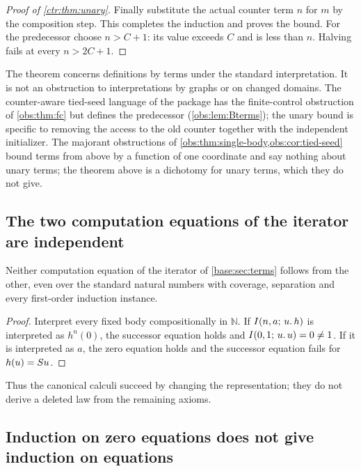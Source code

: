 \begin{proof}[Proof of \cref{ctr:thm:unary}]
Finally substitute the actual counter term $n$ for $m$ by the composition step. This
completes the induction and proves the bound. For the predecessor choose $n>C+1$: its
value exceeds $C$ and is less than $n$. Halving fails at every $n>2C+1$.
\end{proof}

\begin{remark}
The theorem concerns definitions by terms under the standard interpretation. It is not an
obstruction to interpretations by graphs or on changed domains. The counter-aware tied-seed
language of the package  has the finite-control obstruction of
\cref{obs:thm:fc} but defines the predecessor (\cref{obs:lem:Bterms}); the unary bound is
specific to removing the access to the old counter together with the independent
initializer. The majorant obstructions of \cref{obs:thm:single-body,obs:cor:tied-seed}
bound terms from above by a function of one coordinate and say nothing about unary terms;
the theorem above is a dichotomy for unary terms, which they do not give.
\end{remark}

\subsection{The two computation equations of the iterator are independent}

\begin{proposition}\label{ctr:prop:indep}
Neither computation equation of the iterator of \cref{base:sec:terms} follows from the
other, even over the standard natural numbers with coverage, separation and every
first-order induction instance.
\end{proposition}
\begin{proof}
Interpret every fixed body compositionally in $\mathbb N$. If
$I(n,a;\,u.\,h)$ is interpreted as $h^n(0)$, the successor equation holds and
$I(0,1;\,u.\,u)=0\neq 1$. If it is interpreted as $a$, the zero equation holds and the
successor equation fails for $h(u)=S u$.
\end{proof}

Thus the canonical calculi succeed by changing the representation; they do not derive a
deleted law from the remaining axioms.

\subsection{Induction on zero equations does not give induction on equations}

